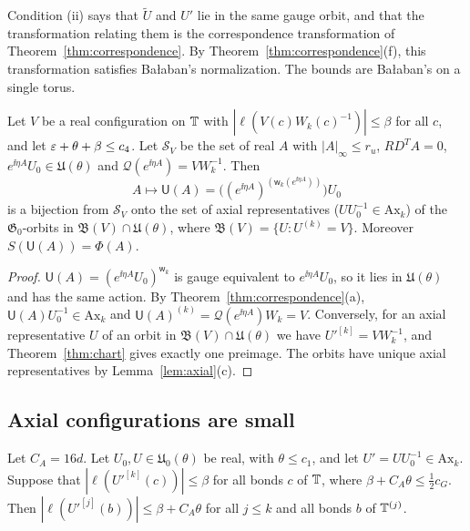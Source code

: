Condition (ii) says that $\tilde U$ and $U'$ lie in the same gauge orbit, and that the transformation relating them is the correspondence transformation of Theorem~\ref{thm:correspondence}. By Theorem~\ref{thm:correspondence}(f), this transformation satisfies Ba\l aban's normalization. The bounds are Ba\l aban's \cite[(1.36)--(1.39)]{BalReg} on a single torus.

\begin{corollary}\label{cor:parametrization}
Let $V$ be a real configuration on $\mathbb T$ with $|\ell(V(c)W_k(c)^{-1})|\le\beta$ for all $c$, and let $\varepsilon+\theta+\beta\le c_4$. Let $\mathcal S_V$ be the set of real $A$ with $|A|_\infty\le r_u$, $R D^TA=0$, $e^{\ii\eta A}U_0\in\mathfrak U(\theta)$ and $\mathcal Q(e^{\ii\eta A})=VW_k^{-1}$. Then
\[
A\longmapsto\mathsf U(A)=\big((e^{\ii\eta A})^{(\mathsf w_k(e^{\ii\eta A}))}\big)U_0
\]
is a bijection from $\mathcal S_V$ onto the set of axial representatives ($UU_0^{-1}\in\mathrm{Ax}_k$) of the $\mathfrak G_0$-orbits in $\mathfrak B(V)\cap\mathfrak U(\theta)$, where $\mathfrak B(V)=\{U:U^{(k)}=V\}$. Moreover $S(\mathsf U(A))=\Phi(A)$.
\end{corollary}

\begin{proof}
$\mathsf U(A)=(e^{\ii\eta A}U_0)^{\mathsf w_k}$ is gauge equivalent to $e^{\ii\eta A}U_0$, so it lies in $\mathfrak U(\theta)$ and has the same action. By Theorem~\ref{thm:correspondence}(a), $\mathsf U(A)U_0^{-1}\in\mathrm{Ax}_k$ and $\mathsf U(A)^{(k)}=\mathcal Q(e^{\ii\eta A})W_k=V$. Conversely, for an axial representative $U$ of an orbit in $\mathfrak B(V)\cap\mathfrak U(\theta)$ we have $U'^{[k]}=VW_k^{-1}$, and Theorem~\ref{thm:chart} gives exactly one preimage. The orbits have unique axial representatives by Lemma~\ref{lem:axial}(c).
\end{proof}

\subsection{Axial configurations are small}

\begin{lemma}\label{lem:axial-small}
Let $C_A=16d$. Let $U_0,U\in\mathfrak U_0(\theta)$ be real, with $\theta\le c_1$, and let $U'=UU_0^{-1}\in\mathrm{Ax}_k$. Suppose that $|\ell(U'^{[k]}(c))|\le\beta$ for all bonds $c$ of $\mathbb T$, where $\beta+C_A\theta\le\frac12c_G$. Then $|\ell(U'^{[j]}(b))|\le\beta+C_A\theta$ for all $j\le k$ and all bonds $b$ of $\mathbb T^{(j)}$.
\end{lemma}


